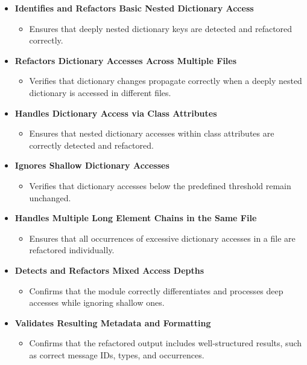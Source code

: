 \documentclass[12pt, titlepage]{article}
\begin{document}
  \begin{itemize}
    \item \textbf{Identifies and Refactors Basic Nested Dictionary Access}
      \begin{itemize}
        \item Ensures that deeply nested dictionary keys are detected
          and refactored correctly.
      \end{itemize}

    \item \textbf{Refactors Dictionary Accesses Across Multiple Files}
      \begin{itemize}
        \item Verifies that dictionary changes propagate correctly
          when a deeply nested dictionary is accessed in different files.
      \end{itemize}

    \item \textbf{Handles Dictionary Access via Class Attributes}
      \begin{itemize}
        \item Ensures that nested dictionary accesses within class
          attributes are correctly detected and refactored.
      \end{itemize}

    \item \textbf{Ignores Shallow Dictionary Accesses}
      \begin{itemize}
        \item Verifies that dictionary accesses below the predefined
          threshold remain unchanged.
      \end{itemize}

    \item \textbf{Handles Multiple Long Element Chains in the Same File}
      \begin{itemize}
        \item Ensures that all occurrences of excessive dictionary
          accesses in a file are refactored individually.
      \end{itemize}

    \item \textbf{Detects and Refactors Mixed Access Depths}
      \begin{itemize}
        \item Confirms that the module correctly differentiates and
          processes deep accesses while ignoring shallow ones.
      \end{itemize}

    \item \textbf{Validates Resulting Metadata and Formatting}
      \begin{itemize}
        \item Confirms that the refactored output includes
          well-structured results, such as correct message IDs,
          types, and occurrences.
      \end{itemize}
  \end{itemize}
\end{document}
